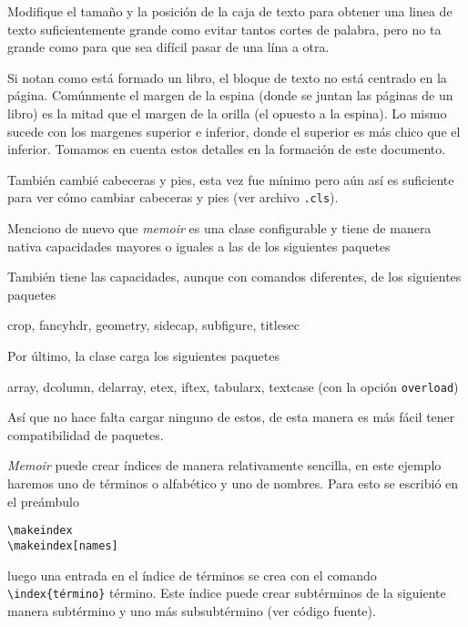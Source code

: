 Modifique el tamaño y la posición de la caja de texto para obtener una linea de texto suficientemente grande como evitar tantos cortes de palabra, pero no ta grande como para que sea difícil pasar de una lína a otra.

Si notan como está formado un libro, el bloque de texto no está centrado
en la página. Comúnmente el margen de la espina (donde se juntan las
páginas de un libro) es la mitad que el margen de la orilla (el opuesto a
la espina). Lo mismo sucede con los margenes superior e inferior, donde el
superior es más chico que el inferior. Tomamos en cuenta estos detalles en
la formación de este documento.

También cambié cabeceras y pies, esta vez fue mínimo pero aún así es
suficiente para ver cómo cambiar cabeceras y pies (ver archivo \texttt{.cls}).

Menciono de nuevo que \textit{memoir} es una clase configurable y tiene de
manera nativa capacidades mayores o iguales a
las de los siguientes paquetes
\begin{center}
\end{center}
También tiene las capacidades, aunque con comandos diferentes, de los siguientes paquetes
\begin{center}
  crop, fancyhdr, geometry, sidecap, subfigure, titlesec
\end{center}
Por último, la clase carga los siguientes paquetes
\begin{center}
  array, dcolumn, delarray, etex, iftex, tabularx, textcase (con la opción \texttt{overload})
\end{center}
Así que no hace falta cargar ninguno de estos, de esta manera es más fácil
tener compatibilidad de paquetes.

\textit{Memoir} puede crear índices de manera relativamente sencilla, en este ejemplo
haremos uno de términos o alfabético y uno de nombres. Para esto se escribió
en el preámbulo
\begin{flushleft}
  \verb|\makeindex|\\
  \verb|\makeindex[names]|
\end{flushleft}
luego una entrada en el índice de términos se crea con el comando
\verb|\index{término}| término. Este índice puede crear
subtérminos de la siguiente manera subtérmino y
uno más subsubtérmino (ver código
fuente).

